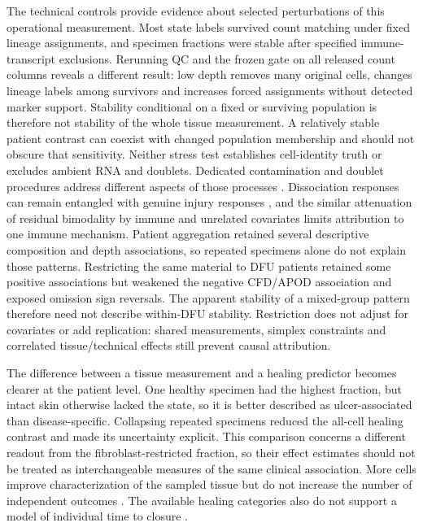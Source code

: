 The technical controls provide evidence about selected perturbations of this operational measurement. Most state labels survived count matching under fixed lineage assignments, and specimen fractions were stable after specified immune-transcript exclusions. Rerunning QC and the frozen gate on all released count columns reveals a different result: low depth removes many original cells, changes lineage labels among survivors and increases forced assignments without detected marker support. Stability conditional on a fixed or surviving population is therefore not stability of the whole tissue measurement. A relatively stable patient contrast can coexist with changed population membership and should not obscure that sensitivity. Neither stress test establishes cell-identity truth or excludes ambient RNA and doublets. Dedicated contamination and doublet procedures address different aspects of those processes \citep{young2020,wolock2019}. Dissociation responses can remain entangled with genuine injury responses \citep{vandenbrink2017}, and the similar attenuation of residual bimodality by immune and unrelated covariates limits attribution to one immune mechanism. Patient aggregation retained several descriptive composition and depth associations, so repeated specimens alone do not explain those patterns. Restricting the same material to DFU patients retained some positive associations but weakened the negative CFD/APOD association and exposed omission sign reversals. The apparent stability of a mixed-group pattern therefore need not describe within-DFU stability. Restriction does not adjust for covariates or add replication: shared measurements, simplex constraints and correlated tissue/technical effects still prevent causal attribution.

The difference between a tissue measurement and a healing predictor becomes clearer at the patient level. One healthy specimen had the highest fraction, but intact skin otherwise lacked the state, so it is better described as ulcer-associated than disease-specific. Collapsing repeated specimens reduced the all-cell healing contrast and made its uncertainty explicit. This comparison concerns a different readout from the fibroblast-restricted fraction, so their effect estimates should not be treated as interchangeable measures of the same clinical association. More cells improve characterization of the sampled tissue but do not increase the number of independent outcomes \citep{squair2021,zimmerman2021}. The available healing categories also do not support a model of individual time to closure \citep{armstrong2017}.

